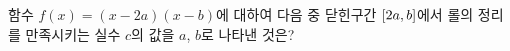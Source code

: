 함수 $f(x)=(x-2a)(x-b)$에 대하여 다음 중 닫힌구간 $[2a{,}\mkern3mu\mathopen{}b]$에서 롤의 정리를 만족시키는 실수 $c$의 값을 $a$, $b$로 나타낸 것은?
